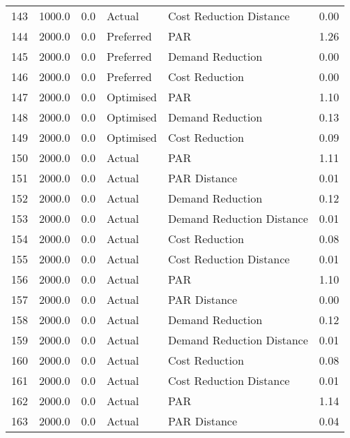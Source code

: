 \begin{longtable}{lrrllr}
143  &       1000.0 &     0.0 &         Actual &    Cost Reduction Distance &   0.00 \\
144  &       2000.0 &     0.0 &      Preferred &                        PAR &   1.26 \\
145  &       2000.0 &     0.0 &      Preferred &           Demand Reduction &   0.00 \\
146  &       2000.0 &     0.0 &      Preferred &             Cost Reduction &   0.00 \\
147  &       2000.0 &     0.0 &      Optimised &                        PAR &   1.10 \\
148  &       2000.0 &     0.0 &      Optimised &           Demand Reduction &   0.13 \\
149  &       2000.0 &     0.0 &      Optimised &             Cost Reduction &   0.09 \\
150  &       2000.0 &     0.0 &         Actual &                        PAR &   1.11 \\
151  &       2000.0 &     0.0 &         Actual &               PAR Distance &   0.01 \\
152  &       2000.0 &     0.0 &         Actual &           Demand Reduction &   0.12 \\
153  &       2000.0 &     0.0 &         Actual &  Demand Reduction Distance &   0.01 \\
154  &       2000.0 &     0.0 &         Actual &             Cost Reduction &   0.08 \\
155  &       2000.0 &     0.0 &         Actual &    Cost Reduction Distance &   0.01 \\
156  &       2000.0 &     0.0 &         Actual &                        PAR &   1.10 \\
157  &       2000.0 &     0.0 &         Actual &               PAR Distance &   0.00 \\
158  &       2000.0 &     0.0 &         Actual &           Demand Reduction &   0.12 \\
159  &       2000.0 &     0.0 &         Actual &  Demand Reduction Distance &   0.01 \\
160  &       2000.0 &     0.0 &         Actual &             Cost Reduction &   0.08 \\
161  &       2000.0 &     0.0 &         Actual &    Cost Reduction Distance &   0.01 \\
162  &       2000.0 &     0.0 &         Actual &                        PAR &   1.14 \\
163  &       2000.0 &     0.0 &         Actual &               PAR Distance &   0.04 \\

\end{longtable}
